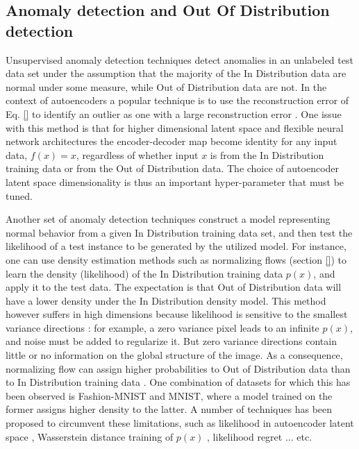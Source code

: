 
\subsection{Anomaly detection and Out Of Distribution detection}\label{ML:sec:anomaly}

Unsupervised anomaly detection techniques detect anomalies in an unlabeled test data set under the assumption that the majority of the In Distribution data are normal under some measure, while Out of Distribution data are not.
In the context of autoencoders
a popular technique is to use the 
reconstruction error of Eq. \ref{} to 
identify an outlier as one with a 
large reconstruction error \cite{}. One issue with this 
method is that for higher dimensional 
latent space and flexible neural network architectures the
encoder-decoder map become identity for 
any input data, $f(x)=x$, regardless of whether input $x$ is from the In Distribution training data or from the Out of Distribution data. The choice of 
autoencoder latent space dimensionality is thus an 
important hyper-parameter that must be 
tuned. 

Another set of anomaly detection techniques construct a model representing normal behavior from a given In Distribution training data set, and then test the likelihood of a test instance to be generated by the utilized model. For instance, one can use density 
estimation methods such as normalizing 
flows (section \ref{}) to learn the density (likelihood) of the In Distribution training data $p(x)$, and apply it to 
the test data. The expectation is that 
Out of Distribution data will have a 
lower density under the In Distribution
density model. 
This method however suffers in high 
dimensions because 
likelihood is sensitive to the smallest variance directions \cite{ren2019likelihood}: for example, a zero variance pixel leads to an infinite $p(x)$, and noise must be added to regularize it. But zero variance directions contain little or no information on the global structure of the image.
As a consequence, normalizing flow can assign higher probabilities to Out of Distribution data than to In Distribution training data \cite{nalisnick2018deep}. One combination of datasets for which this has been observed is Fashion-MNIST and MNIST, where a model trained on the former assigns higher density to the latter. A number of techniques has been proposed to 
circumvent these limitations, such as 
likelihood in autoencoder latent space 
\cite{}, Wasserstein distance training of 
$p(x)$ \cite{}, likelihood regret \cite{}... etc. 

